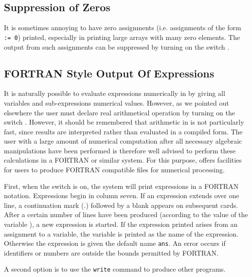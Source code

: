 \subsection{Suppression of Zeros}
\hypertarget{switch:NERO}{}

It is sometimes annoying to have zero assignments (i.e. assignments of the
form \texttt{ := 0}) printed, especially in printing large arrays
with many zero elements.  The output from such assignments can be
suppressed by turning on the switch .

\subsection{{FORTRAN} Style Output Of Expressions}

It is naturally possible to evaluate expressions numerically in {\REDUCE} by
giving all variables and sub-expressions numerical values. However, as we
pointed out elsewhere the user must declare real arithmetical operation by
turning on the switch .  However, it should be
remembered that arithmetic in {\REDUCE} is not particularly fast, since
results are interpreted rather than evaluated in a compiled form. The user
with a large amount of numerical computation after all necessary algebraic
manipulations have been performed is therefore well advised to perform
these calculations in a FORTRAN or similar system.  For
this purpose, {\REDUCE} offers facilities for users to produce FORTRAN
compatible files for numerical processing.

\hypertarget{reserved:CARD_NO}{}
\hypertarget{switch:FORT}{}
First, when the switch  is on, the system will
print expressions in a FORTRAN notation.  Expressions begin in column
seven.  If an expression extends over one line, a continuation mark (.)
followed by a blank appears on subsequent cards.  After a certain number
of lines have been produced (according to the value of the variable
),
a new expression is started.  If the
expression printed arises from an assignment to a variable, the variable
is printed as the name of the expression.  Otherwise the expression is
given the default name \texttt{ans}.  An error occurs if identifiers or
numbers are outside the bounds permitted by FORTRAN.

A second option is to use the \texttt{write} command to produce other programs.

